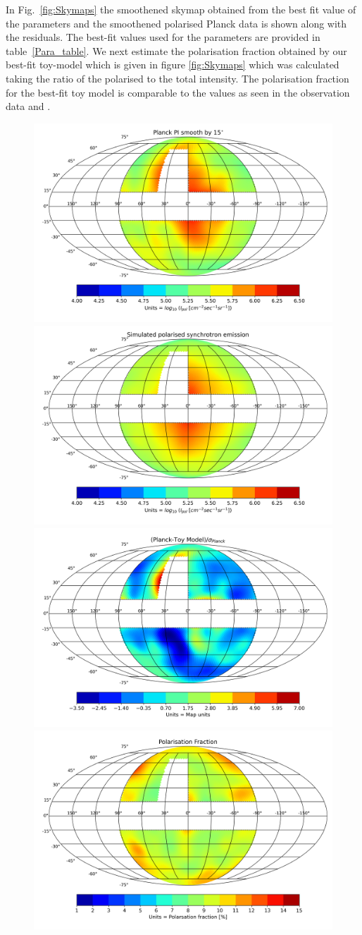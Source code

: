 \documentclass[usenatbib]{mnras}
\begin{document}
In Fig.~\ref{fig:Skymaps} the smoothened skymap obtained from the best fit value of the parameters and the smoothened polarised Planck data is shown along with the residuals. The best-fit values used for the parameters are provided in table~\ref{Para_table}. 
We next estimate the polarisation fraction obtained by our best-fit toy-model which is given in figure \ref{fig:Skymaps} which was calculated taking the ratio of the polarised to the total intensity. The polarisation fraction for the best-fit toy model is comparable to the values as seen in the observation data \cite{Carretti_2013} and \cite{WMAP_Page}.


\begin{figure}
\centering
\includegraphics[width =0.49\linewidth]{Images/Feb-01-2022_Planck_Sky_Map.png}%
\includegraphics[width=0.49\linewidth]{Images/Feb-01-2022Ver1_Skymap_Bstr_3_Btur_6_Rmag_5_Zmag_7_norm_3.76e-13.png}
\includegraphics[width = 0.49\linewidth]{Images/Feb-01-2022_Residue_Bstr_3_Btur_6_Rmag_5_Zmag_7_norm_3.76e-13.png}%
\includegraphics[width =0.49\linewidth]{Images/Feb-01-2022_Pol_Frac_30GHz_Total_Skymap_Bstr_3_Btur_6_Rmag_5_Zmag_7_norm_2.61e-14.png}

\end{figure}
\end{document}
